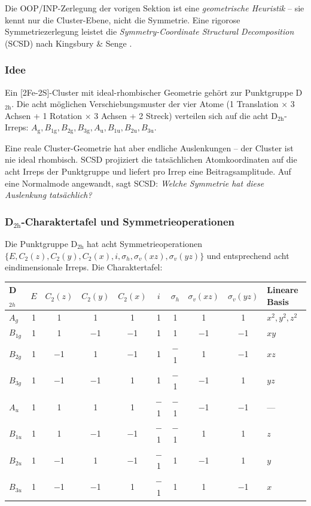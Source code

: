 \documentclass[11pt,a4paper,twoside]{article}
\newcommand{\Ag}{A_{\mathrm{g}}}
\newcommand{\Bgi}[1]{B_{\mathrm{#1g}}}
\newcommand{\Bui}[1]{B_{\mathrm{#1u}}}
\newcommand{\Aui}{A_{\mathrm{u}}}
\theoremstyle{remark}
\begin{document}
Die OOP/INP-Zerlegung der vorigen Sektion ist eine
\emph{geometrische Heuristik} -- sie kennt nur die Cluster-Ebene, nicht
die Symmetrie. Eine rigorose Symmetriezerlegung leistet die
\emph{Symmetry-Coordinate Structural Decomposition} (SCSD) nach
Kingsbury \& Senge \cite{Kingsbury2024}.

\subsubsection*{Idee}

Ein {[}2Fe-2S{]}-Cluster mit ideal-rhombischer Geometrie geh\"ort zur
Punktgruppe D$_\mathrm{2h}$. Die acht m\"oglichen Verschiebungsmuster
der vier Atome (1 Translation $\times$ 3 Achsen + 1 Rotation $\times$
3 Achsen + 2 Streck) verteilen sich auf die acht D$_\mathrm{2h}$-Irreps:
$\Ag, \Bgi{1}, \Bgi{2}, \Bgi{3}, \Aui, \Bui{1}, \Bui{2}, \Bui{3}$.

Eine reale Cluster-Geometrie hat aber endliche Auslenkungen -- der
Cluster ist nie ideal rhombisch. SCSD projiziert die tats\"achlichen
Atomkoordinaten auf die acht Irreps der Punktgruppe und liefert pro
Irrep eine Beitragsamplitude. Auf eine Normalmode angewandt, sagt
SCSD: \emph{Welche Symmetrie hat diese Auslenkung tats\"achlich?}

\subsubsection*{D$_\mathrm{2h}$-Charaktertafel und Symmetrieoperationen}

Die Punktgruppe D$_\mathrm{2h}$ hat acht Symmetrieoperationen
$\{E, C_2(z), C_2(y), C_2(x), i, \sigma_h, \sigma_v(xz), \sigma_v(yz)\}$
und entsprechend acht eindimensionale Irreps. Die Charaktertafel:

\begin{center}
\begin{tabular}{lccccccccl}
  \toprule
  \textbf{D$_{2h}$} & $E$ & $C_2(z)$ & $C_2(y)$ & $C_2(x)$ &
                     $i$ & $\sigma_h$ & $\sigma_v(xz)$ & $\sigma_v(yz)$ &
                     \textbf{Lineare Basis} \\
  \midrule
  $A_g$    & 1 & 1 & 1 & 1 & 1 & 1 & 1 & 1 & $x^2, y^2, z^2$ \\
  $B_{1g}$ & 1 & 1 & $-$1 & $-$1 & 1 & 1 & $-$1 & $-$1 & $xy$ \\
  $B_{2g}$ & 1 & $-$1 & 1 & $-$1 & 1 & $-$1 & 1 & $-$1 & $xz$ \\
  $B_{3g}$ & 1 & $-$1 & $-$1 & 1 & 1 & $-$1 & $-$1 & 1 & $yz$ \\
  $A_u$    & 1 & 1 & 1 & 1 & $-$1 & $-$1 & $-$1 & $-$1 & --- \\
  $B_{1u}$ & 1 & 1 & $-$1 & $-$1 & $-$1 & $-$1 & 1 & 1 & $z$ \\
  $B_{2u}$ & 1 & $-$1 & 1 & $-$1 & $-$1 & 1 & $-$1 & 1 & $y$ \\
  $B_{3u}$ & 1 & $-$1 & $-$1 & 1 & $-$1 & 1 & 1 & $-$1 & $x$ \\
  \bottomrule
\end{tabular}
\end{center}
\end{document}
